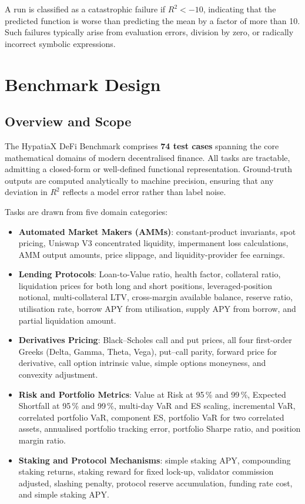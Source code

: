 \documentclass[twoside,11pt]{article}
\newcommand{\Rsq}{R^{2}}
\begin{document}
\begin{definition}
A run is classified as a catastrophic failure if $\Rsq < -10$, indicating that
the predicted function is worse than predicting the mean by a factor of more
than 10.  Such failures typically arise from evaluation errors, division by
zero, or radically incorrect symbolic expressions.
\end{definition}

\section{Benchmark Design}
\label{sec:benchmark}

\subsection{Overview and Scope}\label{subsec:overview-and-scope}
\label{sec:bench_overview}

The HypatiaX DeFi Benchmark comprises \textbf{74 test cases} spanning the core
mathematical domains of modern decentralised finance.  All tasks are tractable,
admitting a closed-form or well-defined functional representation.  Ground-truth
outputs are computed analytically to machine precision, ensuring that any
deviation in $\Rsq$ reflects a model error rather than label noise.

Tasks are drawn from five domain categories:
\begin{itemize}
  \item \textbf{Automated Market Makers (AMMs)}: constant-product invariants,
    spot pricing, Uniswap V3 concentrated liquidity, impermanent loss calculations,
    AMM output amounts, price slippage, and liquidity-provider fee earnings.
  \item \textbf{Lending Protocols}: Loan-to-Value ratio, health factor, collateral ratio,
    liquidation prices for both long and short positions, leveraged-position notional,
    multi-collateral LTV, cross-margin available balance, reserve ratio, utilisation rate,
    borrow APY from utilisation, supply APY from borrow, and partial liquidation amount.
  \item \textbf{Derivatives Pricing}: Black--Scholes call and put prices,
    all four first-order Greeks (Delta, Gamma, Theta, Vega), put--call parity,
    forward price for derivative, call option intrinsic value, simple options
    moneyness, and convexity adjustment.
  \item \textbf{Risk and Portfolio Metrics}: Value at Risk at 95\,\% and 99\,\%,
    Expected Shortfall at 95\,\% and 99\,\%, multi-day VaR and ES scaling,
    incremental VaR, correlated portfolio VaR, component ES, portfolio VaR for
    two correlated assets, annualised portfolio tracking error, portfolio Sharpe
    ratio, and position margin ratio.
  \item \textbf{Staking and Protocol Mechanisms}: simple staking APY, compounding
    staking returns, staking reward for fixed lock-up, validator commission adjusted,
    slashing penalty, protocol reserve accumulation, funding rate cost, and simple
    staking APY.
\end{itemize}
\end{document}
